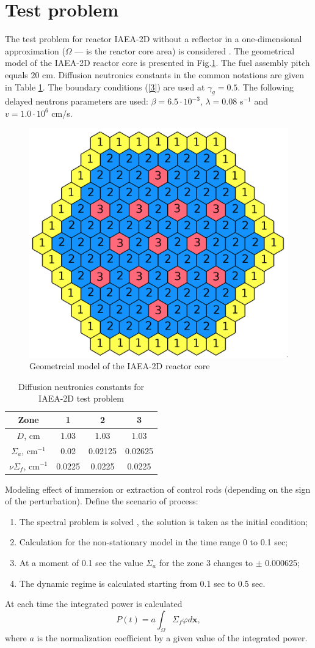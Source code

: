 \documentclass[runningheads]{llncs}
\begin{document}
\section{Test problem}
The test problem for reactor IAEA-2D without a reflector in a one-dimensional approximation ($\Omega$ --- is the reactor core area) is considered \cite{Chao}. The geometrical model of the IAEA-2D reactor core is presented in Fig.\ref{fig:1}. The fuel assembly pitch equals 20 cm. Diffusion neutronics constants in the common notations are given in Table \ref{t-1}. 
The boundary conditions (\ref{3}) are used at $\gamma_g = 0.5$.
The following delayed neutrons parameters are used: $\beta = 6.5 \cdot 10^{−3}$, $\lambda = 0.08$ s$^{-1}$ and $v = 1.0 \cdot 10^6$ cm/s.
\begin{figure}[ht]
  \begin{center}
    \includegraphics[width=0.48\linewidth] {1.png}
	\caption{Geometrcial model of the IAEA-2D reactor core}
	\label{fig:1}
  \end{center}
\end{figure} 
\begin{table}[ht]
\caption{Diffusion neutronics constants for IAEA-2D test problem}
\label{t-1}
\begin{center}
\begin{tabular}{cccc}
\hline
Zone & 1 & 2 & 3\\
\hline
$D$, cm & 1.03 & 1.03 & 1.03 \\
$\Sigma_a$, cm$^{-1}$ & 0.02 & 0.02125 & 0.02625 \\
$\nu\Sigma_{f}$, cm$^{-1}$ & 0.0225 & 0.0225 & 0.0225\\
\hline
\end{tabular}
\end{center}
\end{table}
Modeling effect of immersion or extraction of control rods (depending on the sign of the perturbation). Define the scenario of process:
\begin{enumerate} 
\item The spectral problem is solved \cite{Annals17}, the solution is taken as the initial condition;
\item Calculation for the non-stationary model in the time range 0 to 0.1 sec;
\item At a moment of 0.1 sec the value $\Sigma_a$ for the zone 3 changes to $\pm$ 0.000625;
\item The dynamic regime is calculated starting from 0.1 sec to 0.5 sec.
\end{enumerate}
At each time the integrated power is calculated 
\[
P(t) = a\int_{\Omega}\Sigma_f \varphi d\bm x,
\]
where $a$ is the normalization coefficient by a given value of the integrated power.
\end{document}
